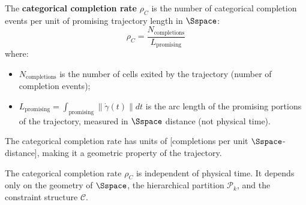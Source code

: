 \begin{definition}
\label{def:categorical_rate}
The \textbf{categorical completion rate} $\rho_C$ is the number of categorical completion events per unit of promising trajectory length in $\Sspace$:
\begin{equation}
\rho_C = \frac{N_{\text{completions}}}{L_{\text{promising}}}
\label{eq:categorical_rate}
\end{equation}
where:
\begin{itemize}
    \item $N_{\text{completions}}$ is the number of cells exited by the trajectory (number of completion events);
    \item $L_{\text{promising}} = \int_{\text{promising}} \|\dot{\gamma}(t)\| dt$ is the arc length of the promising portions of the trajectory, measured in $\Sspace$ distance (not physical time).
\end{itemize}

The categorical completion rate has units of [completions per unit $\Sspace$-distance], making it a geometric property of the trajectory.
\end{definition}

\begin{theorem}
\label{thm:rate_independence}
The categorical completion rate $\rho_C$ is independent of physical time. It depends only on the geometry of $\Sspace$, the hierarchical partition $\mathcal{P}_k$, and the constraint structure $\mathcal{C}$.
\end{theorem}

